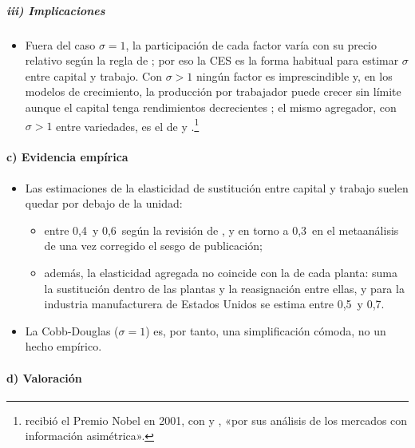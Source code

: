 \documentclass[11pt]{article}
\begin{document}
\subparagraph{iii) Implicaciones}

\begin{itemize}
\item Fuera del caso $\sigma=1$, la participación de cada factor varía con su precio relativo según la regla de ; por eso la CES es la forma habitual para estimar $\sigma$ entre capital y trabajo. Con $\sigma>1$ ningún factor es imprescindible y, en los modelos de crecimiento, la producción por trabajador puede crecer sin límite aunque el capital tenga rendimientos decrecientes ; el mismo agregador, con $\sigma>1$ entre variedades, es el de  y  .\footnote{ recibió el Premio Nobel en 2001, con  y , «por sus análisis de los mercados con información asimétrica»\nocite{Nobel2001AkerlofSpenceStiglitz}.}
\end{itemize}

\paragraph{c) Evidencia empírica}

\begin{itemize}
\item Las estimaciones de la elasticidad de sustitución entre capital y trabajo suelen quedar por debajo de la unidad:
  \begin{itemize}
  \item entre 0,4~y 0,6~según la revisión de \textcite{Chirinko2008Sigma}, y en torno a 0,3~en el metaanálisis de \textcite{GechertEtAl2022Measuring} una vez corregido el sesgo de publicación\nocite{KnoblachRoesslerZwerschke2020};
  \item además, la elasticidad agregada no coincide con la de cada planta: suma la sustitución dentro de las plantas y la reasignación entre ellas, y para la industria manufacturera de Estados Unidos se estima entre 0,5~y 0,7\nocite{OberfieldRaval2021Micro}.
  \end{itemize}
\item La Cobb-Douglas ($\sigma=1$) es, por tanto, una simplificación cómoda, no un hecho empírico.
\end{itemize}

\paragraph{d) Valoración}
\end{document}
